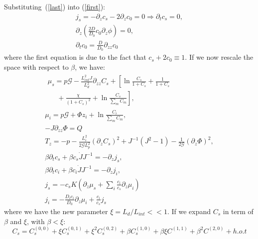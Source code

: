 Substituting~(\ref{last}) into (\ref{first}):
\begin{gather}
j_s = -\partial_z c_s - 2\partial_z c_0=0\Rightarrow \partial_t c_s=0,\\
\partial_z \left( \frac{2D}{D_0}c_0 \partial_z \phi\right) = 0 ,\\
\partial_t c_0 = \frac{D}{D_0}\partial_{zz}c_0
\end{gather}
where the first equation is due to the fact that $c_s+2c_0\equiv1$.
If we now rescale the space with respect to $\beta$, we have:
\begin{gather}
\begin{aligned}
\mu_s = p \mathcal{G} - \frac{L^2_{int}J}{L_d^2}\partial_{zz} C_s + \left[\ln \frac{C_s}{1+C_s} + \frac{1}{1+C_s}\right.\\
\left.\ \ \ \ \ \ +\frac{\chi}{(1+C_s)^2} + \ln \frac{C_s}{\sum_m C_m} \right], \label{sub1}
\end{aligned}\\[2.5mm]
\mu_i = p \mathcal{G}+ \Phi z_i + \ln \frac{C_i}{\sum_m C_m} ,\\
- J\partial_{zz}\Phi = Q\, \\[2.5mm]
T_z= -p - \frac{L^2_i}{2\mathcal{G}L_p^2} (\partial_z C_s)^2+ J^{-1}\left(J^2-1\right)-\frac{1}{2\mathcal{G}}(\partial_z \Phi)^2,\label{sub2}\\
\beta\partial_t c_s + \beta c_s \dot{J}J^{-1}=- \partial_z j_s,\\
\beta\partial_t c_i + \beta c_i \dot{J}J^{-1}= -\partial_z j_i,\\
j_s =-c_sK  \left(\partial_z \mu_s +\sum_i \frac{c_i}{c_s} \partial_z \mu_i\right)\\
j_i= - \frac{D_ic_i}{D_0}\partial_z \mu_i + \frac{c_i}{c_s}j_s
\end{gather}
where we have the new parameter $\xi=L_d/L_{int}<<1$. If we expand $C_s$ in term of $\beta$ and $\xi$, with $\beta<\xi$:
\begin{equation}
C_s = C^{(0,0)}_s+ \xi C_s^{(0,1)}+ \xi^2 C_s^{(0,2)} + \beta C^{(1,0)}_s + \beta\xi C^{(1,1)} + \beta^2 C^{(2,0)}+ h.o.t
\end{equation}

